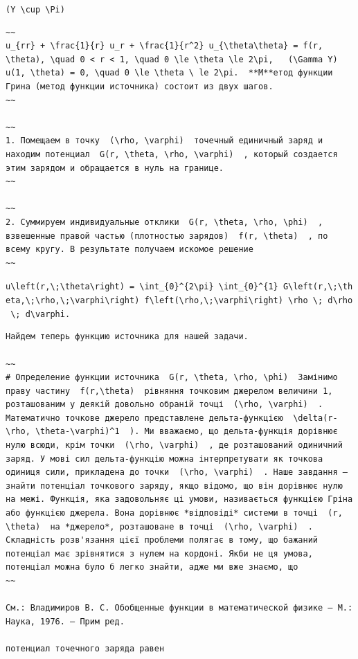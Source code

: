 \documentclass[
  ukrainian,
]{article}
\begin{document}
\texttt{(Y\ \textbackslash{}cup\ \textbackslash{}Pi)}

\begin{verbatim}
~~
u_{rr} + \frac{1}{r} u_r + \frac{1}{r^2} u_{\theta\theta} = f(r, \theta), \quad 0 < r < 1, \quad 0 \le \theta \le 2\pi,   (\Gamma Y)   u(1, \theta) = 0, \quad 0 \le \theta \ le 2\pi.  **М**етод функции Грина (метод функции источника) состоит из двух шагов.
~~

~~
1. Помещаем в точку  (\rho, \varphi)  точечный единичный заряд и находим потенциал  G(r, \theta, \rho, \varphi)  , который создается этим зарядом и обращается в нуль на границе.
~~

~~
2. Суммируем индивидуальные отклики  G(r, \theta, \rho, \phi)  , взвешенные правой частью (плотностью зарядов)  f(r, \theta)  , по всему кругу. В результате получаем искомое решение
~~
\end{verbatim}

\texttt{u\textbackslash{}left(r,\textbackslash{};\textbackslash{}theta\textbackslash{}right)\ =\ \textbackslash{}int\_\{0\}\^{}\{2\textbackslash{}pi\}\ \textbackslash{}int\_\{0\}\^{}\{1\}\ G\textbackslash{}left(r,\textbackslash{};\textbackslash{}theta,\textbackslash{};\textbackslash{}rho,\textbackslash{};\textbackslash{}varphi\textbackslash{}right)\ f\textbackslash{}left(\textbackslash{}rho,\textbackslash{};\textbackslash{}varphi\textbackslash{}right)\ \textbackslash{}rho\ \textbackslash{};\ d\textbackslash{}rho\ \textbackslash{};\ d\textbackslash{}varphi.}

\begin{verbatim}
Найдем теперь функцию источника для нашей задачи.

~~
# Определение функции источника  G(r, \theta, \rho, \phi)  Замінимо праву частину  f(r,\theta)  рівняння точковим джерелом величини 1, розташованим у деякій довольно обраній точці  (\rho, \varphi)  . Математично точкове джерело представлене дельта-функцією  \delta(r-\rho, \theta-\varphi)^1  ). Ми вважаємо, що дельта-функція дорівнює нулю всюди, крім точки  (\rho, \varphi)  , де розташований одиничний заряд. У мові сил дельта-функцію можна інтерпретувати як точкова одиниця сили, прикладена до точки  (\rho, \varphi)  . Наше завдання — знайти потенціал точкового заряду, якщо відомо, що він дорівнює нулю на межі. Функція, яка задовольняє ці умови, називається функцією Гріна або функцією джерела. Вона дорівнює *відповіді* системи в точці  (r, \theta)  на *джерело*, розташоване в точці  (\rho, \varphi)  . Складність розв'язання цієї проблеми полягає в тому, що бажаний потенціал має зрівнятися з нулем на кордоні. Якби не ця умова, потенціал можна було б легко знайти, адже ми вже знаємо, що
~~

См.: Владимиров В. С. Обобщенные функции в математической физике — М.: Наука, 1976. — Прим ред.

потенциал точечного заряда равен
\end{verbatim}
\end{document}
